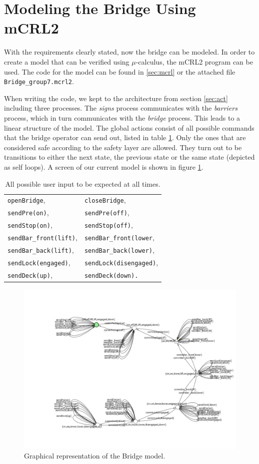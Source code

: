 \section{Modeling the Bridge Using mCRL2}
\label{sec:model}

With the requirements clearly stated, now the bridge can be modeled. In order to create a model that can be verified using $\mu$-calculus, the mCRL2 program can be used. The code for the model can be found in \ref{sec:mcrl} or the attached file \texttt{Bridge\_group7.mcrl2}.

When writing the code, we kept to the architecture from section \ref{sec:act} including three processes. The \emph{signs} process communicates with the \emph{barriers} process, which in turn communicates with the \emph{bridge} process. This leads to a linear structure of the model. The global actions consist of all possible commands that the bridge operator can send out, listed in table \ref{tab:allow}. Only the ones that are considered safe according to the safety layer are allowed. They turn out to be transitions to either the next state, the previous state or the same state (depicted as self loops). A screen of our current model is shown in figure \ref{fig:graph}.
%
\begin{table}[htb]%
\begin{tabular}{ll}
	\texttt{openBridge},& \texttt{closeBridge},\\
	\texttt{sendPre(on)},& \texttt{sendPre(off)},\\
	\texttt{sendStop(on)},& \texttt{sendStop(off)},\\
	\texttt{sendBar\_front(lift)},& \texttt{sendBar\_front(lower},\\
	\texttt{sendBar\_back(lift)},& \texttt{sendBar\_back(lower)},\\
	\texttt{sendLock(engaged)},& \texttt{sendLock(disengaged)},\\
	\texttt{sendDeck(up)},& \texttt{sendDeck(down).}\\
\end{tabular}
\caption{All possible user input to be expected at all times.}
\label{tab:allow}
\end{table}
%
\begin{figure}[htb]
\centering
\includegraphics[width=\columnwidth]{Images/Bridge_allow_ltsgraph.png}
\caption{Graphical representation of the Bridge model.}%
\label{fig:graph}
\end{figure}%
%

\newpage